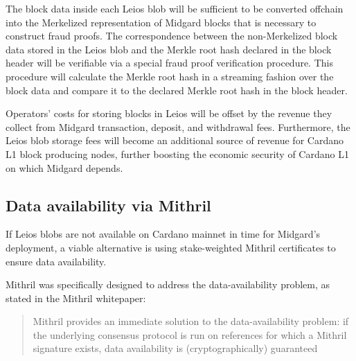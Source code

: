 \documentclass[../midgard.tex]{subfiles}
\begin{document}
The block data inside each Leios blob will be sufficient to be converted offchain into the Merkelized representation of Midgard blocks that is necessary to construct fraud proofs.
The correspondence between the non-Merkelized block data stored in the Leios blob and the Merkle root hash declared in the block header will be verifiable via a special fraud proof verification procedure.
This procedure will calculate the Merkle root hash in a streaming fashion over the block data and compare it to the declared Merkle root hash in the block header.


Operators' costs for storing blocks in Leios will be offset by the revenue they collect from Midgard transaction, deposit, and withdrawal fees.
Furthermore, the Leios blob storage fees will become an additional source of revenue for Cardano L1 block producing nodes, further boosting the economic security of Cardano L1 on which Midgard depends.

\subsection{Data availability via Mithril}
\label{h:data-availability-multisig}

If Leios blobs are not available on Cardano mainnet in time for Midgard's deployment, a viable alternative is using stake-weighted Mithril certificates to ensure data availability.

Mithril was specifically designed to address the data-availability problem, as stated in the Mithril whitepaper:
\begin{quote}
Mithril provides an immediate solution to the data-availability problem: if the underlying consensus protocol is run on references for which a Mithril signature exists, data availability is (cryptographically) guaranteed
\end{quote}
\end{document}
